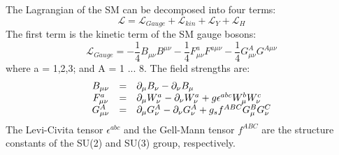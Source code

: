 \documentclass[thesis.tex]{subfiles}
\begin{document}
The Lagrangian of the SM can be decomposed into four terms: 
	\begin{equation}
		\mathcal{L} =  \mathcal{L}_{Gauge} + \mathcal{L}_{kin} + \mathcal{L}_{Y} + \mathcal{L}_{H}
	\end{equation}
The first term is the kinetic term of the SM gauge bosons:
	\begin{equation} 
		\mathcal{L}_{Gauge} = -\frac{1}{4}B_{\mu\nu} B^{\mu\nu} - \frac{1}{4}F_{\mu\nu}^a F^{a \mu\nu} - \frac{1}{4} G_{\mu\nu}^A G^{A \mu\nu}
	\end{equation}
where a = 1,2,3; and A = 1 ... 8. The field strengths are:
	\begin{equation}
		\begin{array}{c c l}
			B_{\mu\nu} & = & \partial_\mu B_\nu - \partial_\nu B_\mu \\
			F_{\mu\nu}^a &=&  \partial_\mu W_\nu^a - \partial_\nu W_\nu^a + g \epsilon^{abc}W_\mu^b W_\nu^c \\
			G_{\mu\nu}^A &=& \partial_\mu G_\nu^A - \partial_\nu G_\nu^A + g_s f^{ABC}G_{\mu}^B G_{\nu}^C 
		\end{array}
	\end{equation}
The Levi-Civita tensor $\epsilon^{abc}$ and the Gell-Mann tensor $f^{ABC}$ are the structure constants of the SU(2) and SU(3) group, respectively. 
		
\end{document}
